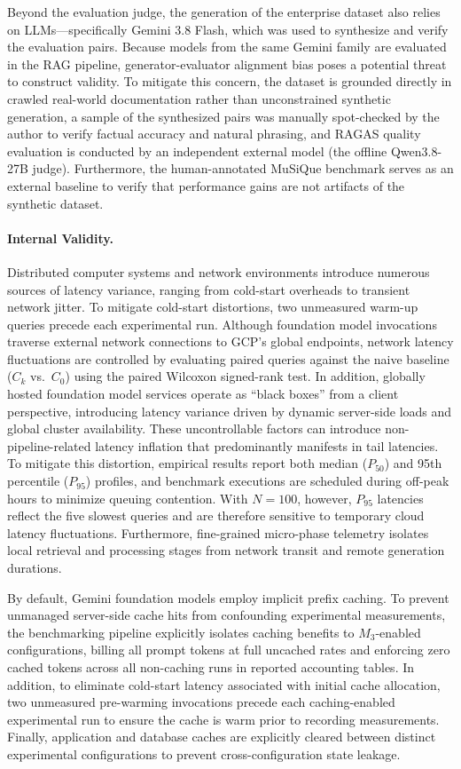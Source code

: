 Beyond the evaluation judge, the generation of the enterprise dataset also relies on LLMs---specifically Gemini 3.8 Flash, which was used to synthesize and verify the evaluation pairs. Because models from the same Gemini family are evaluated in the RAG pipeline, generator-evaluator alignment bias poses a potential threat to construct validity. To mitigate this concern, the dataset is grounded directly in crawled real-world documentation rather than unconstrained synthetic generation, a sample of the synthesized pairs was manually spot-checked by the author to verify factual accuracy and natural phrasing, and RAGAS quality evaluation is conducted by an independent external model (the offline Qwen3.8-27B judge). Furthermore, the human-annotated MuSiQue benchmark serves as an external baseline to verify that performance gains are not artifacts of the synthetic dataset.

\paragraph{Internal Validity.}
Distributed computer systems and network environments introduce numerous sources of latency variance, ranging from cold-start overheads to transient network jitter. To mitigate cold-start distortions, two unmeasured warm-up queries precede each experimental run. Although foundation model invocations traverse external network connections to GCP's global endpoints, network latency fluctuations are controlled by evaluating paired queries against the naive baseline ($C_k$ vs.\ $C_0$) using the paired Wilcoxon signed-rank test. In addition, globally hosted foundation model services operate as ``black boxes'' from a client perspective, introducing latency variance driven by dynamic server-side loads and global cluster availability. These uncontrollable factors can introduce non-pipeline-related latency inflation that predominantly manifests in tail latencies. To mitigate this distortion, empirical results report both median ($P_{50}$) and 95th percentile ($P_{95}$) profiles, and benchmark executions are scheduled during off-peak hours to minimize queuing contention. With $N = 100$, however, $P_{95}$ latencies reflect the five slowest queries and are therefore sensitive to temporary cloud latency fluctuations. Furthermore, fine-grained micro-phase telemetry isolates local retrieval and processing stages from network transit and remote generation durations.

By default, Gemini foundation models employ implicit prefix caching. To prevent unmanaged server-side cache hits from confounding experimental measurements, the benchmarking pipeline explicitly isolates caching benefits to $M_3$-enabled configurations, billing all prompt tokens at full uncached rates and enforcing zero cached tokens across all non-caching runs in reported accounting tables. In addition, to eliminate cold-start latency associated with initial cache allocation, two unmeasured pre-warming invocations precede each caching-enabled experimental run to ensure the cache is warm prior to recording measurements. Finally, application and database caches are explicitly cleared between distinct experimental configurations to prevent cross-configuration state leakage.


